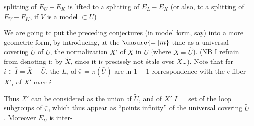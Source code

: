 splitting of $E_U-E_K$ is  lifted to a splitting of $E_L-E_K$ (or also,  to a splitting of $E_V-E_K$, if $V$ is a model $\subset U$)

We are going to put the preceding conjectures (in model form, say) into a more geometric form, by introducing, at the $\unsure{=|\overline m}$ time as a universal covering  $\widetilde U$ of $U$, the normalization  $X'$ of $X$ in $\widetilde U$ (where $X=\widehat U$). (NB I refrain from denoting it by $\widetilde X$, since it is precisely not étale over $X$\ldots). Note that for $i\in\bar I=\bar X-\bar U$, the  $L_i$ of $\bar\pi=\pi(\bar U)$ are in $1-1$ correspondence with the e fiber $X'_i$ of $X'$ over $i$


Thus $X'$ can be considered as the union of $\widetilde U$, and of $X'|\bar I=$ set of the loop subgroups of $\bar\pi$, which thus appear as ``points  infinity'' of the universal covering $\widetilde U$. Moreover $E_U$ is inter-
